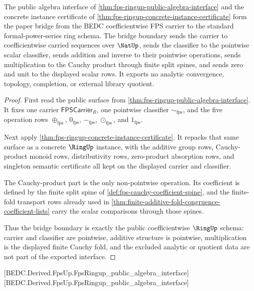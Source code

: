 \begin{theorem}
\label{thm:fps-ringup-standard-bridge-boundary}
The public algebra interface of
\autoref{thm:fps-ringup-public-algebra-interface} and the concrete instance
certificate of \autoref{thm:fps-ringup-concrete-instance-certificate} form the
paper bridge from the BEDC coefficientwise FPS carrier to the standard
formal-power-series ring schema. The bridge boundary sends the carrier to
coefficientwise carried sequences over $\NatUp$, sends the classifier to the
pointwise scalar classifier, sends addition and inverse to their pointwise
operations, sends multiplication to the Cauchy product through finite split
spines, and sends zero and unit to the displayed scalar rows. It exports no
analytic convergence, topology, completion, or external library quotient.
\end{theorem}
\begin{proof}
First read the public surface from
\autoref{thm:fps-ringup-public-algebra-interface}. It fixes one carrier
$\mathsf{FPSCarrier}_R$, one pointwise classifier $\sim_{\mathrm{fps}}$, and the
five operation rows
$\oplus_{\mathrm{fps}}$, $0_{\mathrm{fps}}$, $-_{\mathrm{fps}}$,
$\odot_{\mathrm{fps}}$, and $1_{\mathrm{fps}}$.

Next apply \autoref{thm:fps-ringup-concrete-instance-certificate}. It repacks
that same surface as a concrete $\RingUp$ instance, with the additive group rows,
Cauchy-product monoid rows, distributivity rows, zero-product absorption rows,
and singleton semantic certificate all kept on the displayed carrier and
classifier.

The Cauchy-product part is the only non-pointwise operation. Its coefficient is
defined by the finite split spine of \autoref{def:fps-cauchy-coefficient-spine},
and the finite-fold transport rows already used in
\autoref{thm:finite-additive-fold-congruence-coefficient-lists} carry the scalar
comparisons through those spines.

Thus the bridge boundary is exactly the public coefficientwise $\RingUp$ schema:
carrier and classifier are pointwise, additive structure is pointwise,
multiplication is the displayed finite Cauchy fold, and the excluded analytic or
quotient data are not part of the exported interface.
\end{proof}

[BEDC.Derived.FpsUp.FpsRingup\_public\_algebra\_interface]
[BEDC.Derived.FpsUp.FpsRingup\_public\_algebra\_interface]

